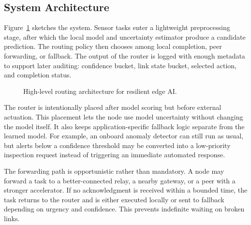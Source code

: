 \documentclass[10pt, conference]{IEEEtran}
\begin{document}
\subsection{System Architecture}
Figure~\ref{fig:arch} sketches the system. Sensor tasks enter a lightweight preprocessing stage, after which the local model and uncertainty estimator produce a candidate prediction. The routing policy then chooses among local completion, peer forwarding, or fallback. The output of the router is logged with enough metadata to support later auditing: confidence bucket, link state bucket, selected action, and completion status.

\begin{figure}[t]
\centering
{}
\caption{High-level routing architecture for resilient edge AI.}
\label{fig:arch}
\end{figure}

The router is intentionally placed after model scoring but before external actuation. This placement lets the node use model uncertainty without changing the model itself. It also keeps application-specific fallback logic separate from the learned model. For example, an onboard anomaly detector can still run as usual, but alerts below a confidence threshold may be converted into a low-priority inspection request instead of triggering an immediate automated response.

The forwarding path is opportunistic rather than mandatory. A node may forward a task to a better-connected relay, a nearby gateway, or a peer with a stronger accelerator. If no acknowledgment is received within a bounded time, the task returns to the router and is either executed locally or sent to fallback depending on urgency and confidence. This prevents indefinite waiting on broken links.
\end{document}
